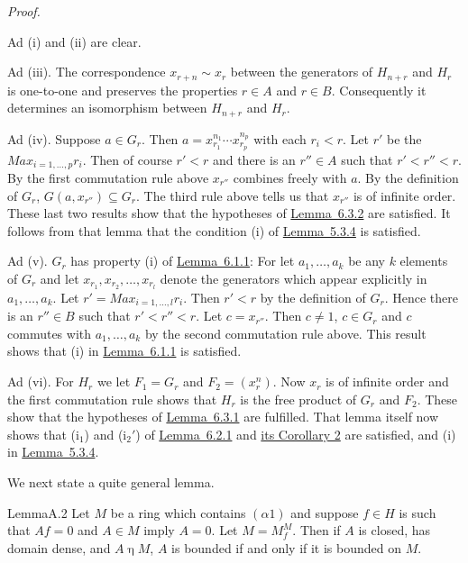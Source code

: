 \documentclass[b5paper,twoside]{article}
\newcommand{\lemref}[2]{\hyperref[#1]{\mbox{Lemma~#2}}}
\theoremstyle{mvnplain}
\renewenvironment{proof}[1][Proof]{%
  \par\addvspace{0.35\baselineskip}%
  \noindent\textit{#1.}\ \normalfont\ignorespaces
}{%
  \par\addvspace{0.35\baselineskip}%
}
\newcommand{\M}{\mathbf M}
\newcommand{\Hilbert}{\mathfrak H}
\def\M{M}%
\def\Hilbert{H}%
\def\operatorname#1{#1}%
\def\mathfrak#1{#1}%
\begin{document}
\begin{proof}
Ad (i) and (ii) are clear.

Ad (iii). The correspondence $x_{r+n}\sim x_r$ between the generators of
$\mathfrak H_{n+r}$ and $\mathfrak H_r$ is one-to-one
and preserves the properties $r\in A$ and $r\in B$. Consequently it
determines an isomorphism between $\mathfrak H_{n+r}$ and $\mathfrak H_r$.

Ad (iv). Suppose $a\in\mathfrak G_r$. Then
$a=x_{r_1}^{n_1}\cdots x_{r_p}^{n_p}$ with each $r_i<r$. Let $r'$ be the
$\operatorname{Max}_{i=1,\ldots,p}r_i$. Then of course $r'<r$ and there is an
$r''\in A$ such that $r'<r''<r$. By the first commutation rule above $x_{r''}$
combines freely with $a$. By the definition of $\mathfrak G_r$,
$\mathfrak G(a,x_{r''})\subseteq\mathfrak G_r$. The third rule above tells us
that $x_{r''}$ is of infinite order. These last two results show that the
hypotheses of \lemref{lem:6.3.2}{6.3.2} are satisfied. It follows from that
lemma that the condition (i) of \lemref{lem:5.3.4}{5.3.4} is satisfied.

Ad (v). $\mathfrak G_r$ has property (i) of
\lemref{lem:6.1.1}{6.1.1}: For let $a_1,\ldots,a_k$ be any $k$ elements of
$\mathfrak G_r$ and let $x_{r_1},x_{r_2},\ldots,x_{r_l}$ denote the generators
which appear explicitly in $a_1,\ldots,a_k$. Let
$r'=\operatorname{Max}_{i=1,\ldots,l}r_i$. Then $r'<r$ by the definition of
$\mathfrak G_r$. Hence there is an $r''\in B$ such that $r'<r''<r$. Let
$c=x_{r''}$. Then $c\ne1$, $c\in\mathfrak G_r$ and $c$ commutes with
$a_1,\ldots,a_k$ by the second commutation rule above. This result shows that
(i) in \lemref{lem:6.1.1}{6.1.1} is satisfied.

Ad (vi). For $\mathfrak H_r$ we let
$\mathfrak F_1=\mathfrak G_r$ and $\mathfrak F_2=(x_r^n)$. Now $x_r$ is of
infinite order and the first commutation rule shows that
$\mathfrak H_r$ is the free product of $\mathfrak G_r$ and
$\mathfrak F_2$. These show that the hypotheses of
\lemref{lem:6.3.1}{6.3.1} are fulfilled. That lemma itself now shows that
(i$_1$) and (i$_2'$) of \lemref{lem:6.2.1}{6.2.1} and
\hyperref[cor:6.2.2]{its Corollary 2} are
satisfied, and (i) in \lemref{lem:5.3.4}{5.3.4}.
\end{proof}

We next state a quite general lemma.
\begin{namedstatement}{Lemma}{A.2}\label{lem:A.2}
Let $\M$ be a ring which contains $(\alpha1)$ and suppose $f\in\Hilbert$ is
such that $Af=0$ and $A\in\M$ imply $A=0$. Let
$\mathfrak M=\mathfrak M_f^{\M}$. Then if $A$ is closed, has domain dense,
and $A\mathbin{\eta}\M$, $A$ is bounded if and only if it is bounded on
$\mathfrak M$.
\end{namedstatement}
\end{document}
